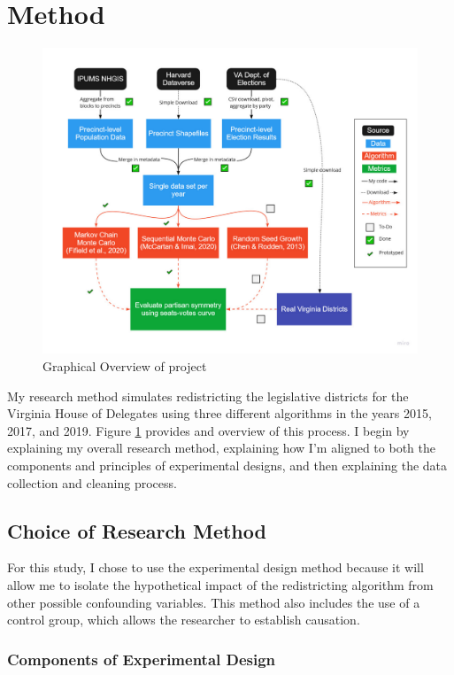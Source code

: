 \section{Method}

\begin{figure}
    \includegraphics[width=\linewidth]{img/flowchart.pdf}
    \caption{Graphical Overview of project}
    \label{fig:flowchart}
\end{figure}

My research method simulates redistricting the legislative districts for the Virginia House of Delegates using three different algorithms in the years 2015, 2017, and 2019. Figure \ref{fig:flowchart} provides and overview of this process. I begin by explaining my overall research method, explaining how I'm aligned to both the components and principles of experimental designs, and then explaining the data collection and cleaning process.

\subsection{Choice of Research Method}

For this study, I chose to use the experimental design method because it will allow me to isolate the hypothetical impact of the redistricting algorithm from other possible confounding variables. This method also includes the use of a control group, which allows the researcher to establish causation. 

\subsubsection{Components of Experimental Design}

